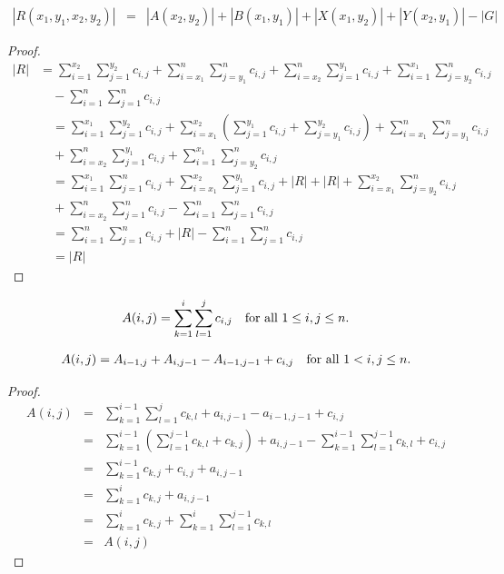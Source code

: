 \documentclass[AMA,LATO1COL]{WileyNJD-v2}
\begin{document}
\begin{eqnarray}
|R(x_1,y_1,x_2,y_2)|&= & |A(x_2,y_2)| + |B(x_1,y_1)| + |X(x_1,y_2)| +|Y(x_2,y_1)| - |G|
\end{eqnarray}

\begin{proof}
\begin{eqnarray}
|R|&=\sum_{i=1}^{x_2}\sum_{j=1}^{y_2}c_{i,j}+\sum_{i={x_1}}^{n}\sum_{j={y_1}}^{n}c_{i,j}+\sum_{i={x_2}}^{n}\sum_{j=1}^{y_1}c_{i,j}+\sum_{i=1}^{x_1}\sum_{j={y_2}}^{n}c_{i,j}\\& \quad-\sum_{i=1}^{n}\sum_{j=1}^{n}c_{i,j}\\&\quad=\sum_{i=1}^{x_1}\sum_{j=1}^{y_2}c_{i,j}+\sum_{i={x_1}}^{x_2}(\sum_{j=1}^{y_1}c_{i,j}+\sum_{j={y_1}}^{y_2}c_{i,j})+\sum_{i={x_1}}^{n}\sum_{j={y_1}}^{n}c_{i,j}\\& \quad +\sum_{i={x_2}}^{n}\sum_{j=1}^{y_1}c_{i,j}+\sum_{i=1}^{x_1}\sum_{j={y_2}}^{n}c_{i,j}\\&\quad=\sum_{i=1}^{x_1}\sum_{j=1}^{n}c_{i,j}+\sum_{i={x_1}}^{x_2}\sum_{j=1}^{y_1}c_{i,j}+|R|+|R|+\sum_{i={x_1}}^{x_2}\sum_{j={y_2}}^{n}c_{i,j}\\&\quad+\sum_{i={x_2}}^n\sum_{j=1}^{n}c_{i,j}-\sum_{i=1}^n\sum_{j=1}^{n}c_{i,j}
\\&\quad =\sum_{i=1}^n\sum_{j=1}^{n}c_{i,j}+|R|-\sum_{i=1}^n\sum_{j=1}^{n}c_{i,j}\\&\quad =|R|
\end{eqnarray}
\end{proof}

\begin{definition}
\begin{eqnarray}
A(i,j)=\sum_{k=1}^{i}\sum_{l=1}^{j}c_{i,j}\mbox{\quad for all $1\leq i,j\leq n$}.
\end{eqnarray}
\end{definition}

\begin{lemma}
\begin{eqnarray}
A(i,j)=A_{i-1,j}+A_{i,j-1}-A_{i-1,j-1}+c_{i,j} \mbox{\quad for all $1<i,j\leq n$}.
\end{eqnarray}
\end{lemma}

\begin{proof}
\begin{eqnarray}
A(i,j)& = & \sum_{k=1}^{i-1}\sum_{l=1}^{j}c_{k,l}+a_{i,j-1}-a_{i-1,j-1}+c_{i,j}\\
 & = & \sum_{k=1}^{i-1}\left(\sum_{l=1}^{j-1}c_{k,l}+c_{k,j}\right)+a_{i,j-1}-\sum_{k=1}^{i-1}\sum_{l=1}^{j-1}c_{k,l}+c_{i,j}\\
 & = & \sum_{k=1}^{i-1}c_{k,j}+c_{i,j}+a_{i,j-1}\\
 & = & \sum_{k=1}^{i}c_{k,j}+a_{i,j-1}\\
 & = & \sum_{k=1}^{i}c_{k,j}+\sum_{k=1}^{i}\sum_{l=1}^{j-1}c_{k,l}\\
 & = & A(i,j)
\end{eqnarray}

\end{proof}
\end{document}
